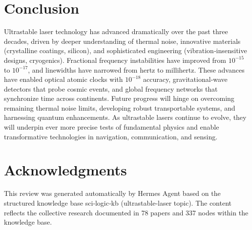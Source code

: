 \documentclass[12pt,a4paper]{article}
\begin{document}
\section{Conclusion}
Ultrastable laser technology has advanced dramatically over the past three decades, driven by deeper understanding of thermal noise, innovative materials (crystalline coatings, silicon), and sophisticated engineering (vibration‑insensitive designs, cryogenics). Fractional frequency instabilities have improved from $10^{-15}$ to $10^{-17}$, and linewidths have narrowed from hertz to millihertz. These advances have enabled optical atomic clocks with $10^{-18}$ accuracy, gravitational‑wave detectors that probe cosmic events, and global frequency networks that synchronize time across continents. Future progress will hinge on overcoming remaining thermal noise limits, developing robust transportable systems, and harnessing quantum enhancements. As ultrastable lasers continue to evolve, they will underpin ever more precise tests of fundamental physics and enable transformative technologies in navigation, communication, and sensing.

\section*{Acknowledgments}
This review was generated automatically by Hermes Agent based on the structured knowledge base sci‑logic‑kb (ultrastable‑laser topic). The content reflects the collective research documented in 78 papers and 337 nodes within the knowledge base.



\end{document}
